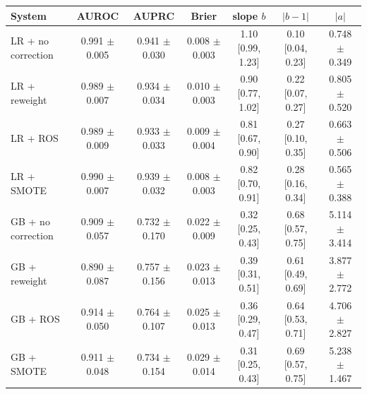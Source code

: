 \begin{tabular}{lcccccc}
\toprule
System & AUROC & AUPRC & Brier & slope $b$ & $|b-1|$ & $|a|$ \\
\midrule
LR + no correction & 0.991 $\pm$ 0.005 & 0.941 $\pm$ 0.030 & 0.008 $\pm$ 0.003 & 1.10 [0.99, 1.23] & 0.10 [0.04, 0.23] & 0.748 $\pm$ 0.349 \\
LR + reweight & 0.989 $\pm$ 0.007 & 0.934 $\pm$ 0.034 & 0.010 $\pm$ 0.003 & 0.90 [0.77, 1.02] & 0.22 [0.07, 0.27] & 0.805 $\pm$ 0.520 \\
LR + ROS & 0.989 $\pm$ 0.009 & 0.933 $\pm$ 0.033 & 0.009 $\pm$ 0.004 & 0.81 [0.67, 0.90] & 0.27 [0.10, 0.35] & 0.663 $\pm$ 0.506 \\
LR + SMOTE & 0.990 $\pm$ 0.007 & 0.939 $\pm$ 0.032 & 0.008 $\pm$ 0.003 & 0.82 [0.70, 0.91] & 0.28 [0.16, 0.34] & 0.565 $\pm$ 0.388 \\
\midrule
GB + no correction & 0.909 $\pm$ 0.057 & 0.732 $\pm$ 0.170 & 0.022 $\pm$ 0.009 & 0.32 [0.25, 0.43] & 0.68 [0.57, 0.75] & 5.114 $\pm$ 3.414 \\
GB + reweight & 0.890 $\pm$ 0.087 & 0.757 $\pm$ 0.156 & 0.023 $\pm$ 0.013 & 0.39 [0.31, 0.51] & 0.61 [0.49, 0.69] & 3.877 $\pm$ 2.772 \\
GB + ROS & 0.914 $\pm$ 0.050 & 0.764 $\pm$ 0.107 & 0.025 $\pm$ 0.013 & 0.36 [0.29, 0.47] & 0.64 [0.53, 0.71] & 4.706 $\pm$ 2.827 \\
GB + SMOTE & 0.911 $\pm$ 0.048 & 0.734 $\pm$ 0.154 & 0.029 $\pm$ 0.014 & 0.31 [0.25, 0.43] & 0.69 [0.57, 0.75] & 5.238 $\pm$ 1.467 \\
\bottomrule
\end{tabular}
